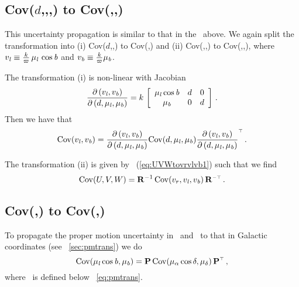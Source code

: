 \subsection{Cov($d$,\vrr,\pmll,\pmbb) to Cov(\galU,\galV,\galW)}

This uncertainty propagation is similar to that in the \sectionname\ above. We again split the transformation into (i) Cov($d$,\pmll,\pmbb) to Cov(\vll,\vbb) and (ii) Cov(\vrr,\vll,\vbb) to Cov(\galU,\galV,\galW), where $v_{\it l} \equiv
\frac{k}{\varpi}\,\mu_{\it l}\,\cos{\it b}$ and $v_{\it b} \equiv \frac{k}{\varpi}\mu_{\it b}$.

The transformation (i) is non-linear with Jacobian
\begin{equation}
\frac{\partial \left(v_{\it l},v_{\it b}\right)}{\partial\left(d,\mu_{\it l},\mu_{\it b}\right)}
= k\,\left[ \begin{array}{ccc} \mu_{\it l} \cos {\it b} & d & 0\\\mu_{\it b} & 0 & d\end{array} \right] \,.
\end{equation}
Then we have that
\begin{equation}
\mathrm{Cov}(v_{\it l},v_{\it b}) = \frac{\partial \left(
  v_{\it l},v_{\it b}\right)}{\partial \left(d,\mu_{\it l},\mu_{\it b}\right)}
\mathrm{Cov}(d,\mu_{\it l},\mu_{\it b}) \frac{\partial \left(
  v_{\it l},v_{\it b}\right)}{\partial \left(d,\mu_{\it l},\mu_{\it b}\right)}^{\scriptscriptstyle \top}\,.
\end{equation}

The transformation (ii) is given by
\eqnname~(\ref{eq:UVWtovrvlvb1}) such that we find
\begin{equation}
\mathrm{Cov}(U,V,W) = \mathbf{R}^{-1}\, \mathrm{Cov}(v_r,v_{\it l},v_{\it b}) \, \mathbf{R}^{\scriptscriptstyle -\top}\,.
\end{equation}

\subsection{Cov(\pmra,\pmdec) to Cov(\pmll,\pmbb)}

To propagate the proper motion uncertainty in \ra\ and \dec\ to that
in Galactic coordinates (see \sectionname~\ref{sec:pmtrans}) we do
\begin{equation}
\mathrm{Cov}(\mu_{\it l} \cos {\it b},\mu_{\it b}) = \mbox{\bf P}\, \mathrm{Cov}(\mu_{\alpha} \cos \delta ,\mu_{\delta}) \,\mbox{\bf P}^{\scriptscriptstyle \top}\,,
\end{equation}
where \PP\ is defined below \eqnname~\ref{eq:pmtrans}.



